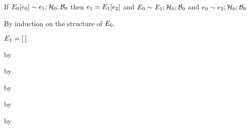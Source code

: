\begin{lemma}\label{AT-A-ctx}
  If\/ $E_0[e_0] \sim e_1; \mathcal{H}_0; \mathcal{B}_0$
  then\/ $e_1 = E_1[e_2]$
  and\/ $E_0 \sim E_1; \mathcal{H}_0; \mathcal{B}_0$
  and\/ $e_0 \sim e_2; \mathcal{H}_0; \mathcal{B}_0$
\end{lemma}
\begin{lamportproof}
  By induction on the structure of $E_0$.

    \begin{pfproof}
      \qedstep
        \begin{pfproof}
          $E_1 = {[\,]}$
        \end{pfproof}
    \end{pfproof}

    \begin{pfproof}
      \qedstep
        \begin{pfproof}
          by \pfih
        \end{pfproof}
    \end{pfproof}

    \begin{pfproof}
      \qedstep
        \begin{pfproof}
          by \pfih
        \end{pfproof}
    \end{pfproof}

    \begin{pfproof}
      \qedstep
        \begin{pfproof}
          by \pfih
        \end{pfproof}
    \end{pfproof}

    \begin{pfproof}
      \qedstep
        \begin{pfproof}
          by \pfih
        \end{pfproof}
    \end{pfproof}

    \begin{pfproof}
      \qedstep
        \begin{pfproof}
          by \pfih
        \end{pfproof}
    \end{pfproof}


\end{lamportproof}
